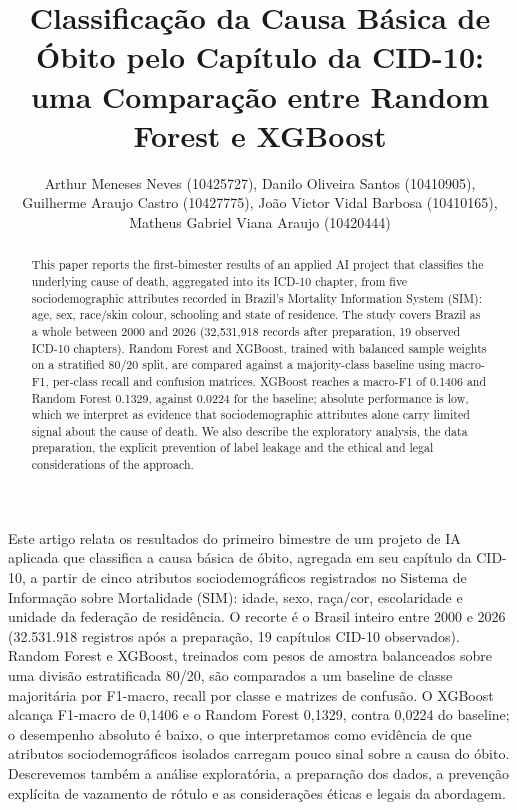 \documentclass[12pt]{article}
\title{Classificação da Causa Básica de Óbito pelo Capítulo da CID-10:\\
  uma Comparação entre Random Forest e XGBoost}
\author{Arthur Meneses Neves (10425727), Danilo Oliveira Santos (10410905),\\
  Guilherme Araujo Castro (10427775), João Victor Vidal Barbosa (10410165),\\
  Matheus Gabriel Viana Araujo (10420444)}
\begin{document}
\maketitle

\begin{abstract}
  This paper reports the first-bimester results of an applied AI project that
  classifies the underlying cause of death, aggregated into its ICD-10
  chapter, from five sociodemographic attributes recorded in Brazil's
  Mortality Information System (SIM): age, sex, race/skin colour, schooling
  and state of residence. The study covers Brazil as a whole between 2000 and
  2026 (32,531,918 records after preparation, 19 observed ICD-10 chapters).
  Random Forest and XGBoost, trained with balanced sample weights on a
  stratified 80/20 split, are compared against a majority-class baseline using
  macro-F1, per-class recall and confusion matrices. XGBoost reaches a
  macro-F1 of 0.1406 and Random Forest 0.1329, against 0.0224 for the
  baseline; absolute performance is low, which we interpret as evidence that
  sociodemographic attributes alone carry limited signal about the cause of
  death. We also describe the exploratory analysis, the data preparation,
  the explicit prevention of label leakage and the ethical and legal
  considerations of the approach.
\end{abstract}

\begin{resumo}
  Este artigo relata os resultados do primeiro bimestre de um projeto de IA
  aplicada que classifica a causa básica de óbito, agregada em seu capítulo
  da CID-10, a partir de cinco atributos sociodemográficos registrados no
  Sistema de Informação sobre Mortalidade (SIM): idade, sexo, raça/cor,
  escolaridade e unidade da federação de residência. O recorte é o Brasil
  inteiro entre 2000 e 2026 (32.531.918 registros após a preparação, 19
  capítulos CID-10 observados). Random Forest e XGBoost, treinados com pesos
  de amostra balanceados sobre uma divisão estratificada 80/20, são
  comparados a um baseline de classe majoritária por F1-macro, recall por
  classe e matrizes de confusão. O XGBoost alcança F1-macro de 0,1406 e o
  Random Forest 0,1329, contra 0,0224 do baseline; o desempenho absoluto é
  baixo, o que interpretamos como evidência de que atributos
  sociodemográficos isolados carregam pouco sinal sobre a causa do óbito.
  Descrevemos também a análise exploratória, a preparação dos dados, a
  prevenção explícita de vazamento de rótulo e as considerações éticas e
  legais da abordagem.
\end{resumo}
\end{document}
